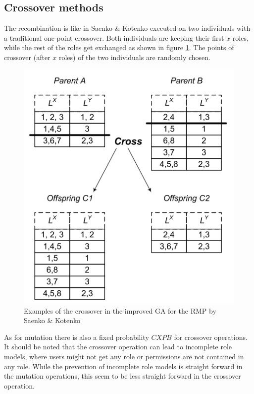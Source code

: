         \subsection{Crossover methods}
        The recombination is like in Saenko \& Kotenko\cite{saenko2012design} executed on two individuals with a traditional one-point crossover. Both individuals are keeping their first $x$ roles, while the rest of the roles get exchanged as shown in figure \ref{fig:crossover}. The points of crossover (after $x$ roles) of the two individuals are randomly chosen.
        \begin{figure}[H]
            \centering
            \includegraphics[scale=0.8]{./Figures/crossover.png}
            \caption{Examples of the crossover in the improved GA for the RMP by Saenko \& Kotenko\cite{saenko2012design}}
            \label{fig:crossover}
        \end{figure}
        As for mutation there is also a fixed probability $CXPB$ for crossover operations. It should be noted that the crossover operation can lead to incomplete role models, where users might not get any role or permissions are not contained in any role. While the prevention of incomplete role models is straight forward in the mutation operations, this seem to be less straight forward in the crossover operation.
